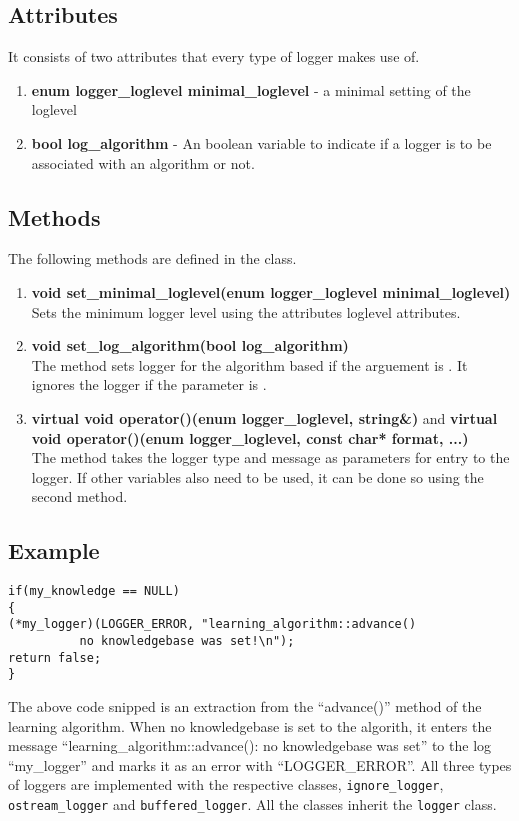 \subsection*{Attributes} 
It consists of two attributes that every type of logger makes use of.
\begin{enumerate}
 \item \textbf{enum logger\_loglevel minimal\_loglevel} - a minimal setting of the loglevel
 \item \textbf{bool log\_algorithm} - An boolean variable to indicate if a logger is to be associated with an algorithm or not.
\end{enumerate}

\subsection*{Methods}
The following methods are defined in the class.
\begin{enumerate}
 \item \textbf{void set\_minimal\_loglevel(enum logger\_loglevel minimal\_loglevel)} \\
	Sets the minimum logger level using the attributes loglevel attributes.
 \item \textbf{void set\_log\_algorithm(bool log\_algorithm)} \\
	The method sets logger for the algorithm based if the arguement is \true. It ignores the logger if the parameter is \false. 
 \item \textbf{virtual void operator()(enum logger\_loglevel, string\&)} and \textbf{virtual void operator()(enum logger\_loglevel, 	const char* format, ...)} \\
	The method takes the logger type and message as parameters for entry to the logger. If other variables also need to be used, it can be done so using the second method. 
\end{enumerate}

\subsection*{Example}
\begin{lstlisting}
if(my_knowledge == NULL) 
{
(*my_logger)(LOGGER_ERROR, "learning_algorithm::advance()  
	      no knowledgebase was set!\n");
return false; 
}
\end{lstlisting}
The above code snipped is an extraction from the ``advance()'' method of the learning algorithm. When no knowledgebase is set to the algorith, it enters the message ``learning\_algorithm::advance(): no knowledgebase was set'' to the log ``my\_logger'' and marks it as an error with ``LOGGER\_ERROR''. 
\vskip 1pt
All three types of loggers are implemented with the respective classes, \texttt{ignore\_logger}, \texttt{ostream\_logger} and \texttt{buffered\_logger}. All the classes inherit the \texttt{logger} class. \\

